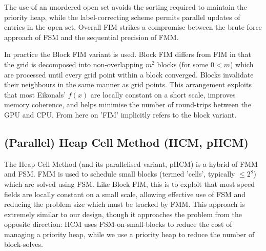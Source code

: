 \documentclass[11pt]{article}       %
\begin{document}
The use of an unordered open set avoids the sorting required to maintain the priority heap, while the label-correcting scheme permits parallel updates of entries in the open set. Overall FIM strikes a compromise between the brute force approach of FSM and the sequential precision of FMM.

In practice the Block FIM variant is used. Block FIM differs from FIM in that the grid is decomposed into non-overlapping $m^2$ blocks (for some $0 < m$) which are processed until every grid point within a block converged. Blocks invalidate their neighbours in the same manner as grid points. This arrangement exploits that most Eikonals' $f(x)$ are locally constant on a short scale, improves memory coherence, and helps minimise the number of round-trips between the GPU and CPU. From here on 'FIM' implicitly refers to the block variant.

\subsection{(Parallel) Heap Cell Method (HCM, pHCM)}\label{sec:HCM}
The Heap Cell Method\cite{chacon2012fast} (and its parallelised variant, pHCM\cite{chacon2014parallel}) is a hybrid of FMM and FSM. FMM is used to schedule small blocks (termed 'cells', typically $\le 2^8$) which are solved using FSM. Like Block FIM, this is to exploit that most speed fields are locally constant on a small scale, allowing effective use of FSM and reducing the problem size which must be tracked by FMM. This approach is extremely similar to our design, though it approaches the problem from the opposite direction: HCM uses FSM-on-small-blocks to reduce the cost of managing a priority heap, while we use a priority heap to reduce the number of block-solves.

\end{document}
